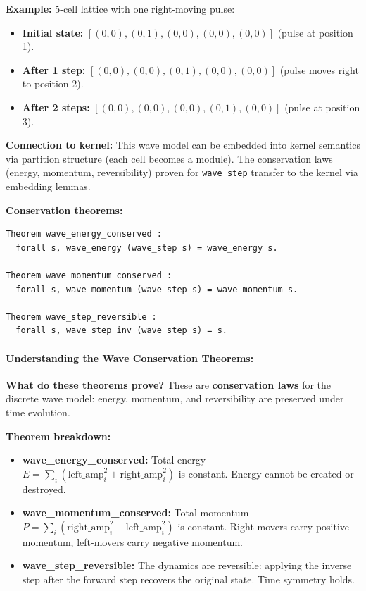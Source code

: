 \textbf{Example:} 5-cell lattice with one right-moving pulse:
\begin{itemize}
    \item \textbf{Initial state:} $[(0,0), (0,1), (0,0), (0,0), (0,0)]$ (pulse at position 1).
    \item \textbf{After 1 step:} $[(0,0), (0,0), (0,1), (0,0), (0,0)]$ (pulse moves right to position 2).
    \item \textbf{After 2 steps:} $[(0,0), (0,0), (0,0), (0,1), (0,0)]$ (pulse at position 3).
\end{itemize}

\textbf{Connection to kernel:} This wave model can be embedded into kernel semantics via partition structure (each cell becomes a module). The conservation laws (energy, momentum, reversibility) proven for \texttt{wave\_step} transfer to the kernel via embedding lemmas.


\textbf{Conservation theorems:}
\begin{lstlisting}
Theorem wave_energy_conserved : 
  forall s, wave_energy (wave_step s) = wave_energy s.

Theorem wave_momentum_conserved : 
  forall s, wave_momentum (wave_step s) = wave_momentum s.

Theorem wave_step_reversible : 
  forall s, wave_step_inv (wave_step s) = s.
\end{lstlisting}

\paragraph{Understanding the Wave Conservation Theorems:}

\textbf{What do these theorems prove?} These are \textbf{conservation laws} for the discrete wave model: energy, momentum, and reversibility are preserved under time evolution.

\textbf{Theorem breakdown:}
\begin{itemize}
    \item \textbf{wave\_energy\_conserved:} Total energy $E = \sum_i (\text{left\_amp}_i^2 + \text{right\_amp}_i^2)$ is constant. Energy cannot be created or destroyed.
    
    \item \textbf{wave\_momentum\_conserved:} Total momentum $P = \sum_i (\text{right\_amp}_i^2 - \text{left\_amp}_i^2)$ is constant. Right-movers carry positive momentum, left-movers carry negative momentum.
    
    \item \textbf{wave\_step\_reversible:} The dynamics are reversible: applying the inverse step after the forward step recovers the original state. Time symmetry holds.
\end{itemize}


